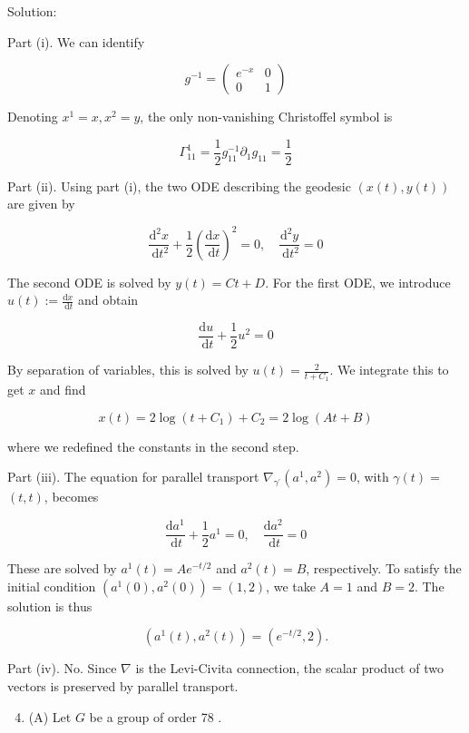\documentclass[10pt]{article}
\begin{document}
Solution:

Part (i). We can identify

$$
g^{-1}=\left(\begin{array}{cc}
e^{-x} & 0 \\
0 & 1
\end{array}\right)
$$

Denoting $x^{1}=x, x^{2}=y$, the only non-vanishing Christoffel symbol is

$$
\Gamma_{11}^{1}=\frac{1}{2} g_{11}^{-1} \partial_{1} g_{11}=\frac{1}{2}
$$

Part (ii). Using part (i), the two ODE describing the geodesic $(x(t), y(t))$ are given by

$$
\frac{\mathrm{d}^{2} x}{\mathrm{~d} t^{2}}+\frac{1}{2}\left(\frac{\mathrm{d} x}{\mathrm{~d} t}\right)^{2}=0, \quad \frac{\mathrm{d}^{2} y}{\mathrm{~d} t^{2}}=0
$$

The second ODE is solved by $y(t)=C t+D$. For the first ODE, we introduce $u(t):=\frac{\mathrm{d} x}{\mathrm{~d} t}$ and obtain

$$
\frac{\mathrm{d} u}{\mathrm{~d} t}+\frac{1}{2} u^{2}=0
$$

By separation of variables, this is solved by $u(t)=\frac{2}{t+C_{1}}$. We integrate this to get $x$ and find

$$
x(t)=2 \log \left(t+C_{1}\right)+C_{2}=2 \log (A t+B)
$$

where we redefined the constants in the second step.

Part (iii). The equation for parallel transport $\nabla_{\gamma^{\prime}}\left(a^{1}, a^{2}\right)=0$, with $\gamma(t)=$ $(t, t)$, becomes

$$
\frac{\mathrm{d} a^{1}}{\mathrm{~d} t}+\frac{1}{2} a^{1}=0, \quad \frac{\mathrm{d} a^{2}}{\mathrm{~d} t}=0
$$

These are solved by $a^{1}(t)=A e^{-t / 2}$ and $a^{2}(t)=B$, respectively. To satisfy the initial condition $\left(a^{1}(0), a^{2}(0)\right)=(1,2)$, we take $A=1$ and $B=2$. The solution is thus

$$
\left(a^{1}(t), a^{2}(t)\right)=\left(e^{-t / 2}, 2\right) .
$$

Part (iv). No. Since $\nabla$ is the Levi-Civita connection, the scalar product of two vectors is preserved by parallel transport.

\begin{enumerate}
  \setcounter{enumi}{3}
  \item (A) Let $G$ be a group of order 78 .
\end{enumerate}
\end{document}
